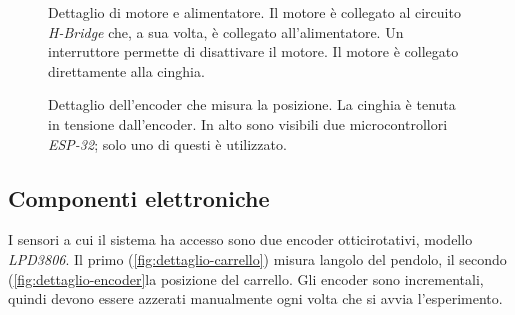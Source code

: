 \begin{figure}[h]
    \centering
    \caption[Dettaglio del motore]{Dettaglio di motore e alimentatore.
    Il motore è collegato al circuito \emph{H-Bridge} che, a sua volta, è collegato
    all'alimentatore. Un interruttore permette di disattivare il motore.
    Il motore è collegato direttamente alla cinghia.}
    \label{fig:dettaglio-motore}
\end{figure}
\begin{figure}[h]
    \centering
    \caption[Dettaglio encoder]{Dettaglio dell'encoder che misura la posizione.
    La cinghia è tenuta in tensione dall'encoder.
    In alto sono visibili due microcontrollori
    \emph{ESP-32}; solo uno di questi è utilizzato.
    }
    \label{fig:dettaglio-encoder}
\end{figure}

\subsection{Componenti elettroniche}
\label{subsec:componenti-elettroniche}

I sensori a cui il sistema ha accesso sono due encoder ottici\footnotemark rotativi,
modello \emph{LPD3806}.
Il primo (\autoref{fig:dettaglio-carrello}) misura langolo del pendolo,
il secondo (\autoref{fig:dettaglio-encoder}la posizione del carrello.
Gli encoder sono incrementali, quindi devono essere azzerati manualmente
ogni volta che si avvia l'esperimento.


